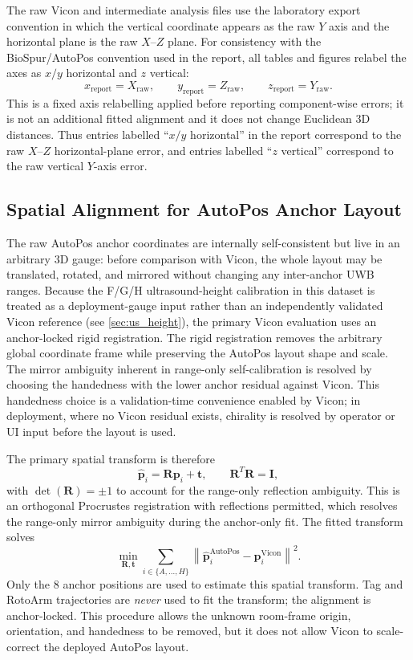 \documentclass[11pt,a4paper]{article}
\begin{document}
The raw Vicon and intermediate analysis files use the laboratory export convention in which the vertical coordinate appears as the raw $Y$ axis and the horizontal plane is the raw $X$--$Z$ plane.
For consistency with the BioSpur/AutoPos convention used in the report, all tables and figures relabel the axes as $x/y$ horizontal and $z$ vertical:
\[
    x_{\mathrm{report}} = X_{\mathrm{raw}}, \qquad
    y_{\mathrm{report}} = Z_{\mathrm{raw}}, \qquad
    z_{\mathrm{report}} = Y_{\mathrm{raw}} .
\]
This is a fixed axis relabelling applied before reporting component-wise errors; it is not an additional fitted alignment and it does not change Euclidean 3D distances.
Thus entries labelled ``$x/y$ horizontal'' in the report correspond to the raw $X$--$Z$ horizontal-plane error, and entries labelled ``$z$ vertical'' correspond to the raw vertical $Y$-axis error.

\subsection{Spatial Alignment for AutoPos Anchor Layout}
\label{sec:coord_alignment}

The raw AutoPos anchor coordinates are internally self-consistent but live in an arbitrary 3D gauge: before comparison with Vicon, the whole layout may be translated, rotated, and mirrored without changing any inter-anchor UWB ranges.
Because the F/G/H ultrasound-height calibration in this dataset is treated as a deployment-gauge input rather than an independently validated Vicon reference (see \cref{sec:us_height}), the primary Vicon evaluation uses an anchor-locked rigid registration.
The rigid registration removes the arbitrary global coordinate frame while preserving the AutoPos layout shape and scale.
The mirror ambiguity inherent in range-only self-calibration is resolved by choosing the handedness with the lower anchor residual against Vicon.
This handedness choice is a validation-time convenience enabled by Vicon; in deployment, where no Vicon residual exists, chirality is resolved by operator or UI input before the layout is used.

The primary spatial transform is therefore
\[
    \hat{\mathbf{p}}_i = \mathbf{R}\mathbf{p}_i + \mathbf{t},
    \qquad
    \mathbf{R}^{T}\mathbf{R}=\mathbf{I},
\]
with $\det(\mathbf{R})=\pm 1$ to account for the range-only reflection ambiguity.
This is an orthogonal Procrustes registration with reflections permitted, which resolves the range-only mirror ambiguity during the anchor-only fit.
The fitted transform solves
\[
    \min_{\mathbf{R},\mathbf{t}} \sum_{i \in \{A,\ldots,H\}}
    \left\lVert
    \hat{\mathbf{p}}_i^{\mathrm{AutoPos}}
    -
    \mathbf{p}_i^{\mathrm{Vicon}}
    \right\rVert^2 .
\]
Only the 8 anchor positions are used to estimate this spatial transform.
Tag and RotoArm trajectories are \emph{never} used to fit the transform; the alignment is anchor-locked.
This procedure allows the unknown room-frame origin, orientation, and handedness to be removed, but it does not allow Vicon to scale-correct the deployed AutoPos layout.
\end{document}
